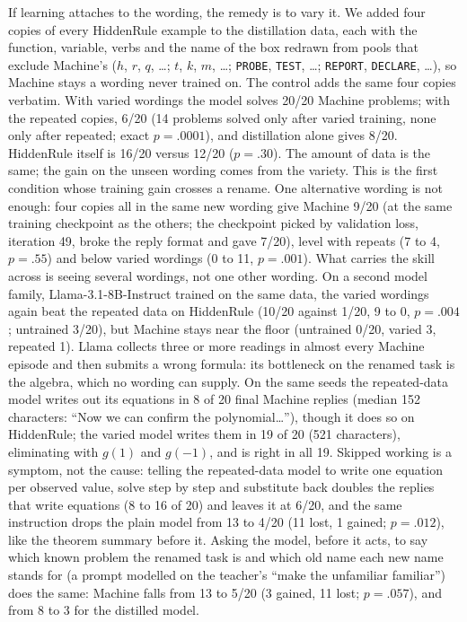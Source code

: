 \documentclass[11pt]{article}
\begin{document}
If learning attaches to the wording, the remedy is to vary it. We added four copies of every HiddenRule example
to the distillation data, each with the function, variable, verbs and the name of the box redrawn from pools
that exclude Machine's ($h$, $r$, $q$, \ldots; $t$, $k$, $m$, \ldots; \texttt{PROBE}, \texttt{TEST}, \ldots;
\texttt{REPORT}, \texttt{DECLARE}, \ldots), so Machine stays a wording never trained on. The control adds the
same four copies verbatim. With varied wordings the model solves 20/20 Machine problems; with the repeated copies,
6/20 (14 problems solved only after varied training, none only after repeated; exact $p=.0001$), and distillation
alone gives 8/20. HiddenRule itself is 16/20 versus 12/20 ($p=.30$). The amount of data is the same; the gain on
the unseen wording comes from the variety. This is the first condition whose training gain crosses a rename. One alternative wording is not enough: four copies all in the same new
wording give Machine 9/20 (at the same training checkpoint as the others; the checkpoint picked by validation loss,
iteration 49, broke the reply format and gave 7/20), level with repeats (7 to 4, $p=.55$) and below varied
wordings (0 to 11, $p=.001$). What carries the skill across is seeing several wordings, not one other wording. On a second model family,
Llama-3.1-8B-Instruct trained on the same data, the varied wordings again beat the repeated data on HiddenRule
(10/20 against 1/20, 9 to 0, $p=.004$; untrained 3/20), but Machine stays near the floor (untrained 0/20, varied 3,
repeated 1). Llama collects three or more readings in almost every Machine episode and then submits a wrong
formula: its bottleneck on the renamed task is the algebra, which no wording can supply. On the same seeds the repeated-data model
writes out its equations in 8 of 20 final Machine replies (median 152 characters: ``Now we can confirm the
polynomial\ldots''), though it does so on HiddenRule; the varied model writes them in 19 of 20 (521 characters),
eliminating with $g(1)$ and $g(-1)$, and is right in all 19. Skipped working is a symptom, not the cause: telling
the repeated-data model to write one equation per observed value, solve step by step and substitute back doubles
the replies that write equations (8 to 16 of 20) and leaves it at 6/20, and the same instruction drops the plain
model from 13 to 4/20 (11 lost, 1 gained; $p=.012$), like the theorem summary before it. Asking the model,
before it acts, to say which known problem the renamed task is and which old name each new name stands for (a prompt
modelled on the teacher's ``make the unfamiliar familiar'') does the same: Machine falls from 13 to 5/20 (3 gained,
11 lost; $p=.057$), and from 8 to 3 for the distilled model.
\end{document}

